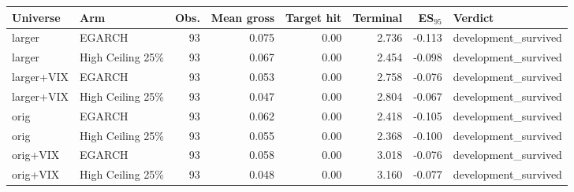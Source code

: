 \begin{tabular}{llrrrrrl}
\toprule
Universe & Arm & Obs. & Mean gross & Target hit & Terminal & ES$_{95}$ & Verdict \\
\midrule
larger & EGARCH & 93 & 0.075 & 0.00 & 2.736 & -0.113 & development\_survived \\
larger & High Ceiling 25\% & 93 & 0.067 & 0.00 & 2.454 & -0.098 & development\_survived \\
larger+VIX & EGARCH & 93 & 0.053 & 0.00 & 2.758 & -0.076 & development\_survived \\
larger+VIX & High Ceiling 25\% & 93 & 0.047 & 0.00 & 2.804 & -0.067 & development\_survived \\
orig & EGARCH & 93 & 0.062 & 0.00 & 2.418 & -0.105 & development\_survived \\
orig & High Ceiling 25\% & 93 & 0.055 & 0.00 & 2.368 & -0.100 & development\_survived \\
orig+VIX & EGARCH & 93 & 0.058 & 0.00 & 3.018 & -0.076 & development\_survived \\
orig+VIX & High Ceiling 25\% & 93 & 0.048 & 0.00 & 3.160 & -0.077 & development\_survived \\
\bottomrule
\end{tabular}
